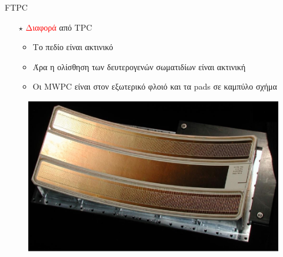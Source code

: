 \documentclass[18pt,notheorems,hyperref={pdfauthor=whatever}]{beamer}
\begin{document}
\begin{frame}{FTPC}
     \begin{minipage}{0.47\textwidth}
        \begin{itemize}
            \item[$\star$] \textcolor{red}{Διαφορά} από TPC
                \begin{itemize}
                    \item Το πεδίο είναι ακτινικό
                    \item Άρα η ολίσθηση των δευτερογενών σωματιδίων είναι ακτινική 
                    \item Οι MWPC είναι στον εξωτερικό φλοιό και τα pads σε καμπύλο σχήμα
                \end{itemize}
        \end{itemize}
    \end{minipage}
    \begin{minipage}{0.5\textwidth}
        \begin{figure}
            \centering
            \includegraphics[scale=0.3]{images/FTPC.png}
        \end{figure}
        \begin{figure}
            \centering

\end{figure}
\end{minipage}
\end{frame}
\end{document}
